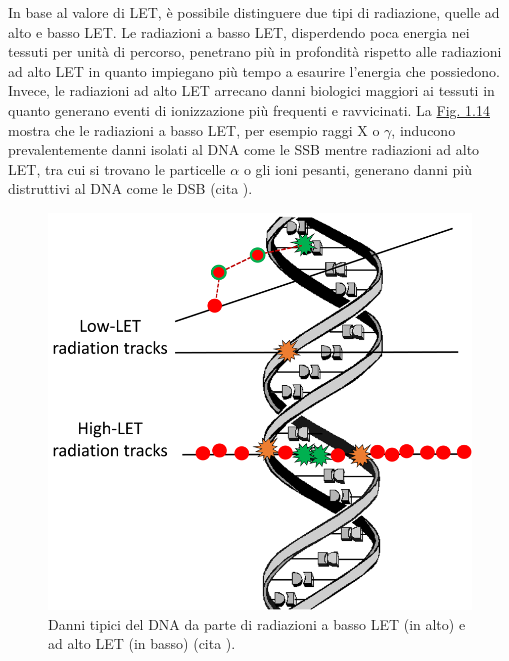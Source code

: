\documentclass[12pt,a4paper,twoside]{report}
\begin{document}
	In base al valore di LET, è possibile distinguere due tipi di radiazione, quelle ad alto e basso LET. Le radiazioni a basso LET, disperdendo poca energia nei tessuti per unità di percorso, penetrano più in profondità rispetto alle radiazioni ad alto LET in quanto impiegano più tempo a esaurire l'energia che possiedono. Invece, le radiazioni ad alto LET arrecano danni biologici maggiori ai tessuti in quanto generano eventi di ionizzazione più frequenti e ravvicinati. La \hyperref[fig:damage_let]{Fig. 1.14} mostra che le radiazioni a basso LET, per esempio raggi X o $\gamma$, inducono prevalentemente danni isolati al DNA come le SSB mentre radiazioni ad alto LET, tra cui si trovano le particelle $\alpha$ o gli ioni pesanti, generano danni più distruttivi al DNA come le DSB (cita
	).
	\begin{figure}[H]
		\centering
		\includegraphics[width=0.9\linewidth]{damage_let.png}
		\caption{Danni tipici del DNA da parte di radiazioni a basso LET (in alto) e ad alto LET (in basso) (cita
			).}
		\label{fig:damage_let}
	\end{figure}
\end{document}
